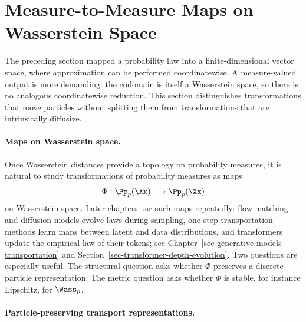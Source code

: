 \section{Measure-to-Measure Maps on Wasserstein Space}\label{sec-measure-to-measure-maps}

The preceding section mapped a probability law into a finite-dimensional vector space, where approximation can be performed coordinatewise. A measure-valued output is more demanding: the codomain is itself a Wasserstein space, so there is no analogous coordinatewise reduction. This section distinguishes transformations that move particles without splitting them from transformations that are intrinsically diffusive.

\paragraph{Maps on Wasserstein space.}

Once Wasserstein distances provide a topology on probability measures, it is natural to study transformations of probability measures as maps
\[
	\Phi:\Pp_p(\Xx)\longrightarrow \Pp_p(\Xx)
\]
on Wasserstein space. Later chapters use such maps repeatedly: flow matching and diffusion models evolve laws during sampling, one-step transportation methods learn maps between latent and data distributions, and transformers update the empirical law of their tokens; see Chapter~\ref{sec-generative-models-transportation} and Section~\ref{sec-transformer-depth-evolution}. Two questions are especially useful. The structural question asks whether $\Phi$ preserves a discrete particle representation. The metric question asks whether $\Phi$ is stable, for instance Lipschitz, for $\Wass_p$.

\paragraph{Particle-preserving transport representations.}

